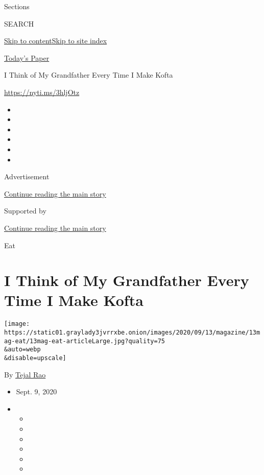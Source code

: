 Sections

SEARCH

\protect\hyperlink{site-content}{Skip to
content}\protect\hyperlink{site-index}{Skip to site index}

\href{https://myaccount.nytimes3xbfgragh.onion/auth/login?response_type=cookie\&client_id=vi}{}

\href{https://www.nytimes3xbfgragh.onion/section/todayspaper}{Today's
Paper}

I Think of My Grandfather Every Time I Make Kofta

\url{https://nyti.ms/3hljOtz}

\begin{itemize}
\item
\item
\item
\item
\item
\item
\end{itemize}

Advertisement

\protect\hyperlink{after-top}{Continue reading the main story}

Supported by

\protect\hyperlink{after-sponsor}{Continue reading the main story}

Eat

\hypertarget{i-think-of-my-grandfather-every-time-i-make-kofta}{%
\section{I Think of My Grandfather Every Time I Make
Kofta}\label{i-think-of-my-grandfather-every-time-i-make-kofta}}

\texttt{[image: https://static01.graylady3jvrrxbe.onion/images/2020/09/13/magazine/13mag-eat/13mag-eat-articleLarge.jpg?quality=75\\\&auto=webp\\\&disable=upscale]}

By \href{https://www.nytimes3xbfgragh.onion/by/tejal-rao}{Tejal Rao}

\begin{itemize}
\item
  Sept. 9, 2020
\item
  \begin{itemize}
  \item
  \item
  \item
  \item
  \item
  \item
  \end{itemize}
\end{itemize}

